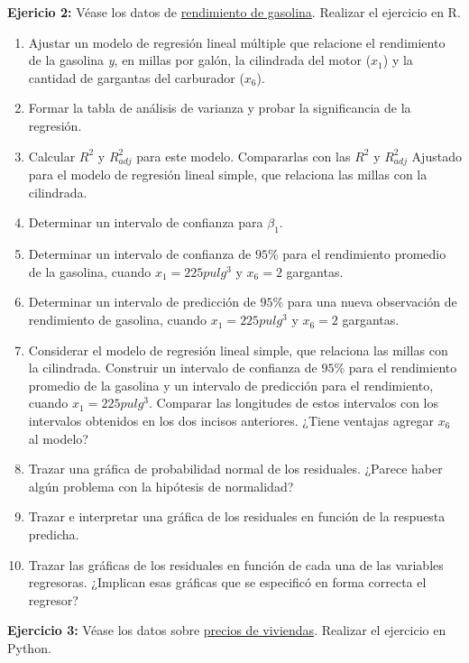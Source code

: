 \documentclass[
]{book}
\begin{document}
\textbf{Ejericio 2:} Véase los datos de \href{https://github.com/HaydeePeruyero/MultivariateStatisticalAnalysis/tree/main/data/Rendimiento_de_gasolina.csv}{rendimiento de gasolina}. Realizar el ejercicio en R.

\begin{enumerate}
\def\labelenumi{\alph{enumi})}
\item
  Ajustar un modelo de regresión lineal múltiple que relacione el rendimiento de la gasolina \emph{y}, en millas por galón, la cilindrada del motor (\(x_1\)) y la cantidad de gargantas del carburador (\(x_6\)).
\item
  Formar la tabla de análisis de varianza y probar la significancia de la regresión.
\item
  Calcular \(R^2\) y \(R^2_{adj}\) para este modelo. Compararlas con las \(R^2\) y \(R^2_{adj}\) Ajustado para el modelo de regresión lineal simple, que relaciona las millas con la cilindrada.
\item
  Determinar un intervalo de confianza para \(\beta_1\).
\item
  Determinar un intervalo de confianza de \(95\%\) para el rendimiento promedio de la gasolina, cuando \(x_1 = 225 pulg^3\) y \(x_6 = 2\) gargantas.
\item
  Determinar un intervalo de predicción de \(95\%\) para una nueva observación de rendimiento de gasolina, cuando \(x_1 = 225 pulg^3\) y \(x_6 = 2\) gargantas.
\item
  Considerar el modelo de regresión lineal simple, que relaciona las millas con la cilindrada. Construir un intervalo de confianza de \(95\%\) para el rendimiento promedio de la gasolina y un intervalo de predicción para el rendimiento, cuando \(x_1 = 225 pulg^3\). Comparar las longitudes de estos intervalos con los intervalos obtenidos en los dos incisos anteriores. ¿Tiene ventajas agregar \(x_6\) al modelo?
\item
  Trazar una gráfica de probabilidad normal de los residuales. ¿Parece haber algún problema con la hipótesis de normalidad?
\item
  Trazar e interpretar una gráfica de los residuales en función de la respuesta predicha.
\item
  Trazar las gráficas de los residuales en función de cada una de las variables regresoras. ¿Implican esas gráficas que se especificó en forma correcta el regresor?
\end{enumerate}

\textbf{Ejercicio 3:} Véase los datos sobre \href{https://github.com/HaydeePeruyero/MultivariateStatisticalAnalysis/tree/main/data/Precios_de_viviendas}{precios de viviendas}. Realizar el ejercicio en Python.
\end{document}
